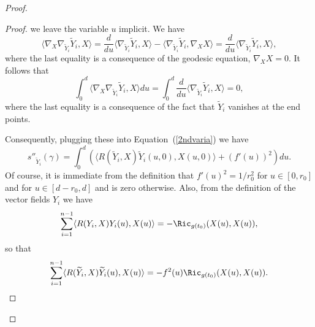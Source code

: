 \begin{proof}
\begin{proof}
we leave the variable $u$ implicit. We have
$$\langle
\nabla_X\nabla_{\widetilde Y_i}\widetilde
Y_i,X\rangle=\frac{d}{du}\langle \nabla_{\widetilde Y_i}\widetilde
Y_i,X\rangle-\langle \nabla_{\widetilde Y_i}\widetilde
Y_i,\nabla_XX\rangle=\frac{d}{du}\langle \nabla_{\widetilde
Y_i}\widetilde Y_i,X\rangle,$$ where the last equality is a
consequence of the geodesic equation, $\nabla_XX=0$. It follows that
$$\int_0^d\langle
\nabla_X\nabla_{\widetilde Y_i}\widetilde Y_i,X\rangle
du=\int_0^d\frac{d}{du}\langle \nabla_{\widetilde Y_i}\widetilde
Y_i,X\rangle=0,$$ where the last equality is a consequence of the
fact that $\widetilde Y_i$ vanishes at the end points.

Consequently, plugging these into Equation~(\ref{2ndvaria}) we have
\begin{equation} \label{sformula} s''_{\widetilde Y_i}(\gamma) =
  \int_0^d\left(\langle R(\widetilde Y_i,X)\widetilde
Y_i(u,0),X(u,0)\rangle+(f'(u))^2\right)du. \end{equation} Of course,
it is immediate from the definition that $f'(u)^2=1/r_0^2$ for $u\in
[0,r_0]$ and for $u\in [d-r_0,d]$ and is zero otherwise. Also, from
the definition of the vector fields $Y_i$ we have
$$\sum_{i=1}^{n-1}\langle
R(Y_i,X)Y_i(u),X(u)\rangle=-\Ric_{g(t_0)}(X(u),X(u)),$$ so that
$$\sum_{i=1}^{n-1}\langle
R(\widetilde Y_i,X)\widetilde
Y_i(u),X(u)\rangle=-f^2(u)\Ric_{g(t_0)}(X(u),X(u)).$$


\end{proof}
\end{proof}
